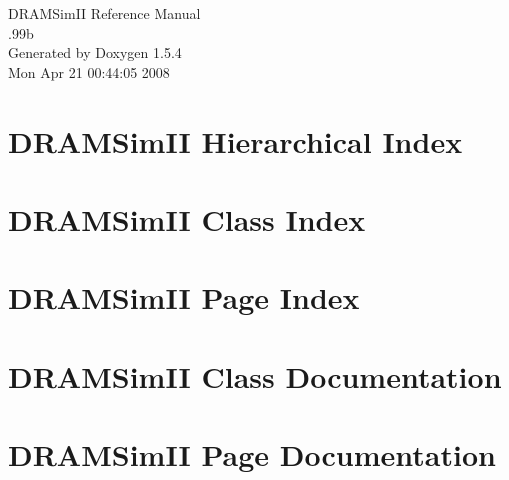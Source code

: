 \documentclass[a4paper]{book}
\begin{document}
\begin{titlepage}
\vspace*{7cm}
\begin{center}
{\Large DRAMSimII Reference Manual\\[1ex]\large .99b }\\
\vspace*{1cm}
{\large Generated by Doxygen 1.5.4}\\
\vspace*{0.5cm}
{\small Mon Apr 21 00:44:05 2008}\\
\end{center}
\end{titlepage}
\clearemptydoublepage
{}
\tableofcontents
\clearemptydoublepage
{}
\chapter{DRAMSimII Hierarchical Index}

\chapter{DRAMSimII Class Index}

\chapter{DRAMSimII Page Index}

\chapter{DRAMSimII Class Documentation}






\chapter{DRAMSimII Page Documentation}

\printindex
\end{document}
